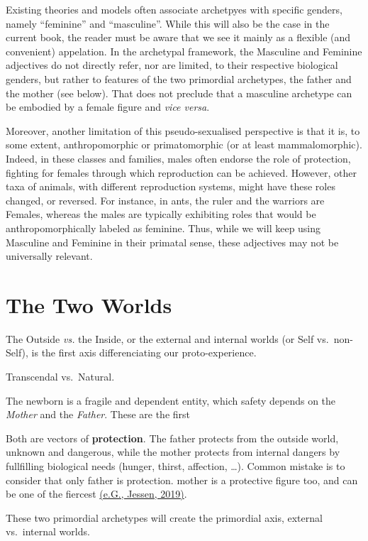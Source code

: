 \documentclass[
]{book}
\begin{document}
Existing theories and models often associate archetpyes with specific genders, namely ``feminine'' and ``masculine''. While this will also be the case in the current book, the reader must be aware that we see it mainly as a flexible (and convenient) appelation. In the archetypal framework, the Masculine and Feminine adjectives do not directly refer, nor are limited, to their respective biological genders, but rather to features of the two primordial archetypes, the father and the mother (see below). That does not preclude that a masculine archetype can be embodied by a female figure and \emph{vice versa}.

Moreover, another limitation of this pseudo-sexualised perspective is that it is, to some extent, anthropomorphic or primatomorphic (or at least mammalomorphic). Indeed, in these classes and families, males often endorse the role of protection, fighting for females through which reproduction can be achieved. However, other taxa of animals, with different reproduction systems, might have these roles changed, or reversed. For instance, in ants, the ruler and the warriors are Females, whereas the males are typically exhibiting roles that would be anthropomorphically labeled as feminine. Thus, while we will keep using Masculine and Feminine in their primatal sense, these adjectives may not be universally relevant.

\hypertarget{the-two-worlds}{%
\section{The Two Worlds}\label{the-two-worlds}}

The Outside \emph{vs.} the Inside, or the external and internal worlds (or Self vs.~non-Self), is the first axis differenciating our proto-experience.

Transcendal vs.~Natural.

The newborn is a fragile and dependent entity, which safety depends on the \emph{Mother} and the \emph{Father}. These are the first

Both are vectors of \textbf{protection}. The father protects from the outside world, unknown and dangerous, while the mother protects from internal dangers by fullfilling biological needs (hunger, thirst, affection, \ldots). Common mistake is to consider that only father is protection. mother is a protective figure too, and can be one of the fiercest \href{https://doi.org/10.1101/827626}{(e.G., Jessen, 2019)}.

These two primordial archetypes will create the primordial axis, external vs.~internal worlds.
\end{document}
